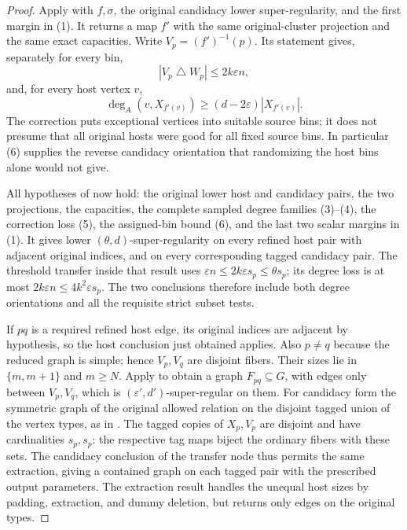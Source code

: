 \begin{proof}
Apply  with $f,\sigma$, the
original candidacy lower super-regularity, and the first margin
in (1). It returns a map $f'$ with the same original-cluster
projection and the same exact capacities. Write $V_p=(f')^{-1}(p)$.
Its statement gives, separately for every bin,
\[
 |V_p\mathbin{\triangle}W_p|\leq2k\varepsilon n,
 \tag{5}
\]
and, for every host vertex $v$,
\[
 \deg_A(v,X_{f'(v)})\geq(d-2\varepsilon)|X_{f'(v)}|.
 \tag{6}
\]
The correction puts exceptional vertices into suitable source bins;
it does not presume that all original hosts were good for all fixed
source bins. In particular (6) supplies the reverse candidacy
orientation that randomizing the host bins alone would not give.

All hypotheses of  now
hold: the original lower host and candidacy pairs, the two projections,
the capacities, the complete sampled degree families (3)--(4),
the correction loss (5), the assigned-bin bound (6), and the last
two scalar margins in (1). It gives lower $(\theta,d)$-super-regularity
on every refined host pair with adjacent original indices, and on
every corresponding tagged candidacy pair. The threshold transfer
inside that result uses $\varepsilon n\leq2k\varepsilon s_p
\leq\theta s_p$; its degree loss is at most
$2k\varepsilon n\leq4k^2\varepsilon s_p$.
The two conclusions therefore include both degree orientations
and all the requisite strict subset tests.

If $pq$ is a required refined host edge, its original indices are
adjacent by hypothesis, so the host conclusion just obtained applies.
Also $p\neq q$ because the reduced graph is simple; hence $V_p,V_q$
are disjoint fibers. Their sizes lie in $\{m,m+1\}$ and $m\geq N$.
Apply  to obtain a graph
$F_{pq}\subseteq G$, with edges only between $V_p,V_q$, which is
$(\varepsilon',d')$-super-regular on them.
For candidacy form the symmetric graph of the original allowed
relation on the disjoint tagged union of the vertex types, as in
. The tagged copies of $X_p,V_p$
are disjoint and have cardinalities $s_p,s_p$: the respective
tag maps biject the ordinary fibers with these sets.
The candidacy conclusion of the transfer node thus permits the
same extraction, giving a contained graph on each tagged pair
with the prescribed output parameters. The extraction result
handles the unequal host sizes by padding, extraction, and dummy
deletion, but returns only edges on the original types.


\end{proof}
